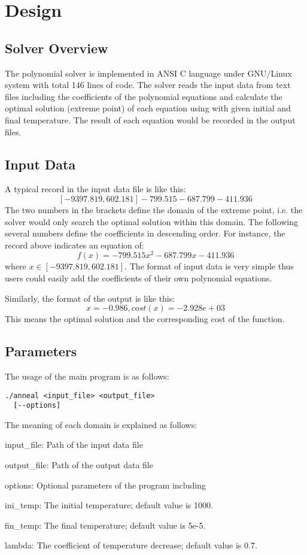 \section{Design}
\label{sec:design}
\subsection{Solver Overview}
The \SA polynomial solver is implemented in ANSI C language under GNU/Linux system with total 146 lines of code. The solver reads the input data from text files including the coefficients of the polynomial equations and calculate the optimal solution (extreme point) of each equation using \SA with given initial and final temperature. The result of each equation would be recorded in the output files.
\subsection{Input Data}
A typical record in the input data file is like this:
$$[-9397.819, 602.181] -799.515 -687.799 -411.936$$
The two numbers in the brackets define the domain of the extreme point, i.e. the solver would only search the optimal solution within this domain. The following several numbers define the coefficients in descending order. For instance, the record above indicates an equation of:
$$f(x) = -799.515x^2-687.799x-411.936$$
where $x\in[-9397.819, 602.181]$. The format of input data is very simple thus users could easily add the coefficients of their own polynomial equations.

Similarly, the format of the output is like this:
$$x = -0.986, cost(x) = -2.928e+03$$
This means the optimal solution and the corresponding cost of the function.
\subsection{Parameters}
The usage of the main program is as follows:
\begin{verbatim}
./anneal <input_file> <output_file>
  [--options]
\end{verbatim}
The meaning of each domain is explained as follows:
\begin{compactitem}
\item input\_file: Path of the input data file
\item output\_file: Path of the output data file
\item options: Optional parameters of the program including
    \begin{compactitem}
    \item ini\_temp: The initial temperature; default value is 1000.
    \item fin\_temp: The final temperature; default value is 5e-5.
    \item lambda: The coefficient of temperature decrease; default value is 0.7.
    \end{compactitem}
\end{compactitem}
